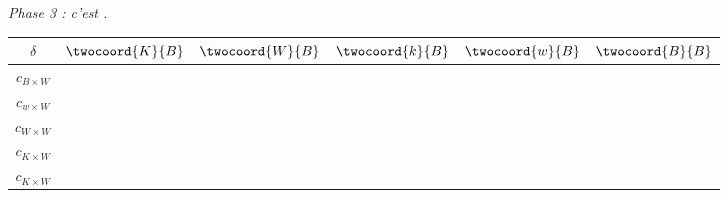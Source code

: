 \begin{center}
	\emph{\small Phase 3 : c'est .}
	
	\smallskip
	\renewcommand{\arraystretch}{1.25}
	\begin{tabular}{|c||c|c|c|c|c|}
		\hline
		$\delta$
			& $\twocoord{K}{B}$
			& $\twocoord{W}{B}$
			& $\twocoord{k}{B}$
			& $\twocoord{w}{B}$
			& $\twocoord{B}{B}$ \\
		\hline
		\hline
		$c_{B\times W}$
			&
			&
			&
			&
			& \\
		\hline
		$c_{w\times W}$
			&
			&
			&
			&
			& \\
		\hline
		$c_{W\times W}$
			&
			&
			&
			&
			& \\
		\hline
		$c_{K\times W}$
			&
			&
			&
			&
			& \\
		\hline
		$c_{K\times W}$
			&
			&
			&
			&
			& \\
		\hline
	\end{tabular}
	\renewcommand{\arraystretch}{1}
\end{center}
